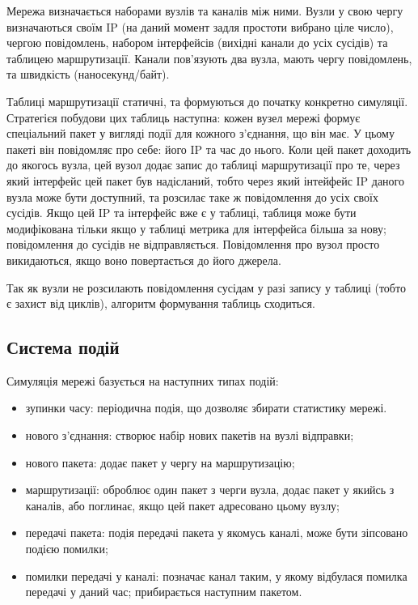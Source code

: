 \documentclass[11pt,a4paper]{article}
\begin{document}
Мережа визначається наборами вузлів та каналів між ними. Вузли у свою чергу визначаються своїм IP (на даний момент задля простоти вибрано ціле число), чергою повідомлень, набором інтерфейсів (вихідні канали до усіх сусідів) та таблицею маршрутизації. Канали пов'язують два вузла, мають чергу повідомлень, та швидкість (наносекунд/байт).

Таблиці маршрутизації статичні, та формуються до початку конкретно симуляції.
Стратегієя побудови цих таблиць наступна: кожен вузел мережі формує 
спеціальний пакет у вигляді події для кожного 
з'єднання, що він має. У цьому пакеті він повідомляє про себе: його IP та час до нього.
Коли цей пакет доходить до якогось вузла, цей вузол додає запис до таблиці маршрутизації про те, 
через який інтерфейс цей пакет був надісланий, тобто через який інтейфейс IP даного вузла може бути доступний, та розсилає 
таке ж повідомлення до усіх своїх сусідів. Якщо цей IP та інтерфейс 
вже є у таблиці, таблиця може бути модифікована тільки якщо у таблиці
метрика для інтерфейса більша за нову; повідомлення до сусідів не відправляється.
Повідомлення про вузол просто викидаються, якщо воно повертається до його джерела.

Так як вузли не розсилають повідомлення сусідам у разі запису у таблиці 
(тобто є захист від циклів), алгоритм формування таблиць сходиться.

\subsection{Система подій}
Симуляція мережі базується на наступних типах подій:
\begin{itemize}
\item зупинки часу: періодична подія, що дозволяє збирати статистику мережі.
\item нового з'єднання: створює набір нових пакетів на вузлі відправки;
\item нового пакета: додає пакет у чергу на маршрутизацію;
\item маршрутизації: оброблює один пакет з черги вузла, додає пакет у якийсь з каналів,
або поглинає, якщо цей пакет адресовано цьому вузлу;
\item передачі пакета: подія передачі пакета у якомусь каналі, може бути зіпсовано подією помилки;
\item помилки передачі у каналі: позначає канал таким, у якому відбулася помилка передачі у даний час;
прибирається наступним пакетом.
\end{itemize}
\end{document}
